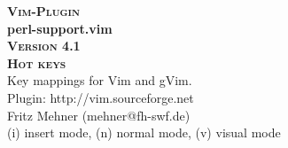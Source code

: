 \documentclass[oneside,10pt,landscape,DIV17]{scrartcl}
\newcommand{\Pluginversion}{4.1}
\begin{document}
%

\begin{multicols}{3}
%
\begin{center}
%
\textbf{\textsc{\small{Vim-Plugin}}}\\
\textbf{\LARGE{perl-support.vim}}\\
\textbf{\textsc{\small{Version \Pluginversion}}}\\
\vspace{5mm}%
\textbf{\textsc{\Huge{Hot keys}}}\\ 
\vspace{5mm}%
Key mappings for Vim and gVim.\\
Plugin: http://vim.sourceforge.net\\
Fritz Mehner (mehner@fh-swf.de)\\
\vspace{1.0mm}
{\normalsize (i)} insert mode, {\normalsize (n)} normal mode, {\normalsize (v)} visual mode\\
\vspace{4.0mm}


\end{center}
\end{multicols}
\end{document}
